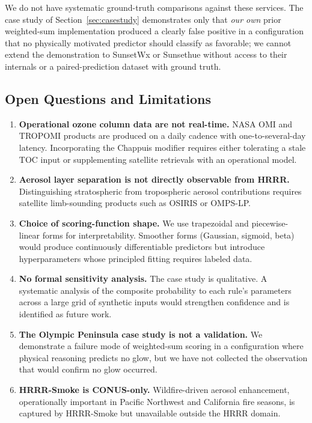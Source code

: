 \documentclass[11pt,a4paper]{article}
\begin{document}
We do not have systematic ground-truth comparisons against these services. The case study of Section~\ref{sec:casestudy} demonstrates only that \emph{our own} prior weighted-sum implementation produced a clearly false positive in a configuration that no physically motivated predictor should classify as favorable; we cannot extend the demonstration to SunsetWx or Sunsethue without access to their internals or a paired-prediction dataset with ground truth.

\subsection{Open Questions and Limitations}
\label{sec:openquestions}

\begin{enumerate}
\item \textbf{Operational ozone column data are not real-time.} NASA OMI and TROPOMI products are produced on a daily cadence with one-to-several-day latency. Incorporating the Chappuis modifier requires either tolerating a stale TOC input or supplementing satellite retrievals with an operational model.
\item \textbf{Aerosol layer separation is not directly observable from HRRR.} Distinguishing stratospheric from tropospheric aerosol contributions requires satellite limb-sounding products such as OSIRIS or OMPS-LP.
\item \textbf{Choice of scoring-function shape.} We use trapezoidal and piecewise-linear forms for interpretability. Smoother forms (Gaussian, sigmoid, beta) would produce continuously differentiable predictors but introduce hyperparameters whose principled fitting requires labeled data.
\item \textbf{No formal sensitivity analysis.} The case study is qualitative. A systematic analysis of the composite probability to each rule's parameters across a large grid of synthetic inputs would strengthen confidence and is identified as future work.
\item \textbf{The Olympic Peninsula case study is not a validation.} We demonstrate a failure mode of weighted-sum scoring in a configuration where physical reasoning predicts no glow, but we have not collected the observation that would confirm no glow occurred.
\item \textbf{HRRR-Smoke is CONUS-only.} Wildfire-driven aerosol enhancement, operationally important in Pacific Northwest and California fire seasons, is captured by HRRR-Smoke but unavailable outside the HRRR domain.
\end{enumerate}
\end{document}
